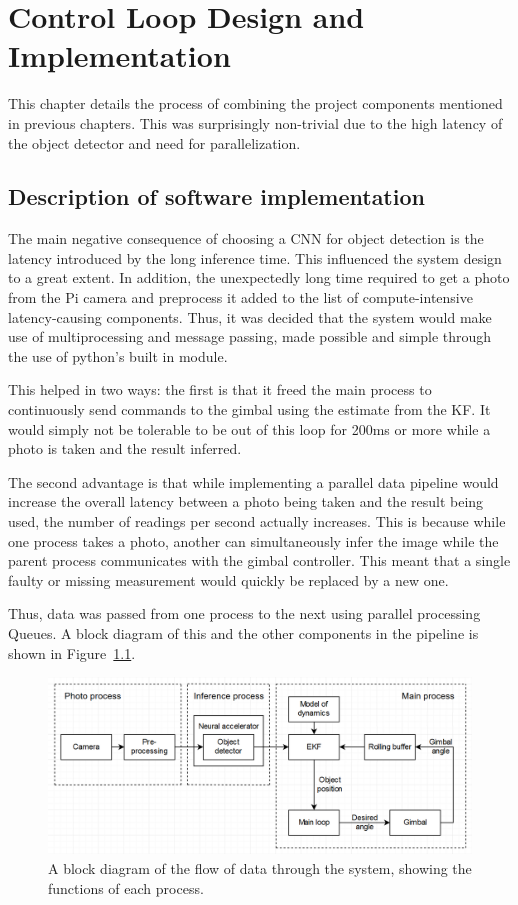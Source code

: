 \chapter{Control Loop Design and\\Implementation}
This chapter details the process of combining the project components mentioned in previous chapters. This was surprisingly non-trivial due to the high latency of the object detector and need for parallelization.

\section{Description of software implementation}
The main negative consequence of choosing a CNN for object detection is the latency introduced by the long inference time. This influenced the system design to a great extent. In addition, the unexpectedly long time required to get a photo from the Pi camera and preprocess it added to the list of compute-intensive latency-causing components. Thus, it was decided that the system would make use of multiprocessing and message passing, made possible and simple through the use of python's built in  module.

This helped in two ways: the first is that it freed the main process to continuously send commands to the gimbal using the estimate from the KF. It would simply not be tolerable to be out of this loop for 200ms or more while a photo is taken and the result inferred.

The second advantage is that while implementing a parallel data pipeline would increase the overall latency between a photo being taken and the result being used, the number of readings per second actually increases. This is because while one process takes a photo, another can simultaneously infer the image while the parent process communicates with the gimbal controller. This meant that a single faulty or missing measurement would quickly be replaced by a new one.

Thus, data was passed from one process to the next using parallel processing Queues. A block diagram of this and the other components in the pipeline is shown in Figure~\ref{fig:system_block_diagram}.

\begin{figure}[h!]
  \centering
  \includegraphics[width=\textwidth]{methodology/system_block_diagram2}
  \caption{\label{fig:system_block_diagram}A block diagram of the flow of data through the system, showing the functions of each process.}
\end{figure}

